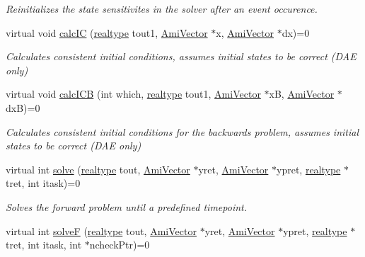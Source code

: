 \begin{DoxyCompactItemize}
\begin{DoxyCompactList}\small\item\em Reinitializes the state sensitivites in the solver after an event occurence. \end{DoxyCompactList}\item 
virtual void \mbox{\hyperlink{classamici_1_1_solver_ac3a257a7b79cc6d69a980a0148873ccc}{calc\+IC}} (\mbox{\hyperlink{namespaceamici_a1bdce28051d6a53868f7ccbf5f2c14a3}{realtype}} tout1, \mbox{\hyperlink{classamici_1_1_ami_vector}{Ami\+Vector}} $\ast$x, \mbox{\hyperlink{classamici_1_1_ami_vector}{Ami\+Vector}} $\ast$dx)=0
\begin{DoxyCompactList}\small\item\em Calculates consistent initial conditions, assumes initial states to be correct (D\+AE only) \end{DoxyCompactList}\item 
virtual void \mbox{\hyperlink{classamici_1_1_solver_a2c1d163bbfb33e9f9c93cda583ad6537}{calc\+I\+CB}} (int which, \mbox{\hyperlink{namespaceamici_a1bdce28051d6a53868f7ccbf5f2c14a3}{realtype}} tout1, \mbox{\hyperlink{classamici_1_1_ami_vector}{Ami\+Vector}} $\ast$xB, \mbox{\hyperlink{classamici_1_1_ami_vector}{Ami\+Vector}} $\ast$dxB)=0
\begin{DoxyCompactList}\small\item\em Calculates consistent initial conditions for the backwards problem, assumes initial states to be correct (D\+AE only) \end{DoxyCompactList}\item 
virtual int \mbox{\hyperlink{classamici_1_1_solver_a977280dc1ce01449f530a2ebc31e5dea}{solve}} (\mbox{\hyperlink{namespaceamici_a1bdce28051d6a53868f7ccbf5f2c14a3}{realtype}} tout, \mbox{\hyperlink{classamici_1_1_ami_vector}{Ami\+Vector}} $\ast$yret, \mbox{\hyperlink{classamici_1_1_ami_vector}{Ami\+Vector}} $\ast$ypret, \mbox{\hyperlink{namespaceamici_a1bdce28051d6a53868f7ccbf5f2c14a3}{realtype}} $\ast$tret, int itask)=0
\begin{DoxyCompactList}\small\item\em Solves the forward problem until a predefined timepoint. \end{DoxyCompactList}\item 
virtual int \mbox{\hyperlink{classamici_1_1_solver_aeb16e555b95787057153731984d69ca1}{solveF}} (\mbox{\hyperlink{namespaceamici_a1bdce28051d6a53868f7ccbf5f2c14a3}{realtype}} tout, \mbox{\hyperlink{classamici_1_1_ami_vector}{Ami\+Vector}} $\ast$yret, \mbox{\hyperlink{classamici_1_1_ami_vector}{Ami\+Vector}} $\ast$ypret, \mbox{\hyperlink{namespaceamici_a1bdce28051d6a53868f7ccbf5f2c14a3}{realtype}} $\ast$tret, int itask, int $\ast$ncheck\+Ptr)=0

\end{DoxyCompactItemize}

